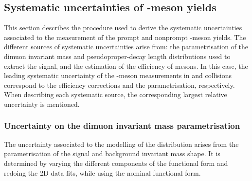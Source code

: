 \subsection{Systematic uncertainties of \texorpdfstring{\JPsi}{J/psi}-meson yields}\label{sec:Charmonia_Analysis_JPsiYieldSystematics}

This section describes the procedure used to derive the systematic uncertainties associated to the measurement of the prompt and nonprompt \JPsi-meson yields. The different sources of systematic uncertainties arise from: the parametrisation of the dimuon invariant mass and pseudoproper-decay length  distributions used to extract the signal, and the estimation of the efficiency of \JPsi mesons. In this case, the leading systematic uncertainty of the \JPsi-meson measurements in \Runpp and \RunPbPb collisions correspond to the \tnp efficiency corrections and the \ctau parametrisation, respectively. When describing each systematic source, the corresponding largest relative uncertainty is mentioned.

\subsubsection{Uncertainty on the dimuon invariant mass parametrisation}\label{sec:Charmonia_Analysis_JPsiYieldSystematics_InvMass}

The uncertainty associated to the modelling of the \mMuMu distribution arises from the parametrisation of the signal and background invariant mass shape. It is determined by varying the different components of the \mMuMu functional form and redoing the 2D data fits, while using the nominal \ctau functional form.

